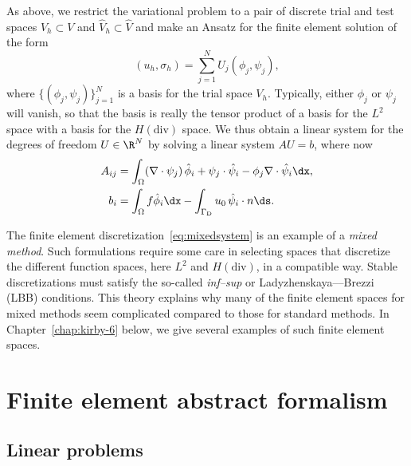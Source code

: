 As above, we restrict the variational problem to a pair of discrete
trial and test spaces $V_h \subset V$ and $\hat{V}_h \subset \hat{V}$
and make an Ansatz for the finite element solution of the form
\begin{equation}
  (u_h, \sigma_h) = \sum_{j=1}^N U_j (\phi_j, \psi_j),
\end{equation}
where $\{(\phi_j, \psi_j)\}_{j=1}^N$ is a basis for the trial space
$V_h$. Typically, either \( \phi_j \) or \( \psi_j \) will vanish, so
that the basis is really the tensor product of a basis for the \( L^2
\) space with a basis for the \( H(\mathrm{div}) \) space. We thus
obtain a linear system for the degrees of freedom $U \in \R^N$ by
solving a linear system $A U = b$, where now
\begin{equation} \label{eq:mixedsystem}
  \begin{split}
    A_{ij} &=
    \int_{\Omega} (\nabla \cdot \psi_j) \, \hat{\phi}_i
    + \psi_j \cdot \hat{\psi}_i
    - \phi_j \nabla \cdot \hat{\psi}_i \dx,
    \\
    b_i &=
    \int_{\Omega} f \hat{\phi}_i \dx
    - \int_{\Gamma_{\mathrm{D}}} u_0 \, \hat{\psi}_i \cdot n \ds.
  \end{split}
\end{equation}

The finite element discretization~\eqref{eq:mixedsystem} is an example
of a \emph{mixed method}. Such formulations require some care in
selecting spaces that discretize the different function spaces, here
$L^2$ and $H(\mathrm{div})$, in a compatible way.  Stable
discretizations must satisfy the so-called \emph{inf--sup} or
Ladyzhenskaya--\babuska{}--Brezzi (LBB) conditions. This theory
explains why many of the finite element spaces for mixed methods seem
complicated compared to those for standard methods. In
Chapter~\ref{chap:kirby-6} below, we give several examples of such
finite element spaces.

\section{Finite element abstract formalism}
\label{sec:abstract}

\subsection{Linear problems}
\label{sec:abstract,linear}


